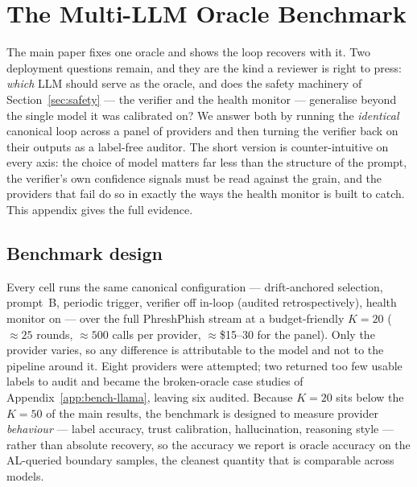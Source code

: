 
\appendix

\section{The Multi-LLM Oracle Benchmark}
\label{app:bench}

The main paper fixes one oracle and shows the loop recovers with it. Two
deployment questions remain, and they are the kind a reviewer is right to press:
\emph{which} LLM should serve as the oracle, and does the safety machinery of
Section~\ref{sec:safety} --- the verifier and the health monitor --- generalise
beyond the single model it was calibrated on? We answer both by running the
\emph{identical} canonical loop across a panel of providers and then turning the
verifier back on their outputs as a label-free auditor. The short version is
counter-intuitive on every axis: the choice of model matters far less than the
structure of the prompt, the verifier's own confidence signals must be read
against the grain, and the providers that fail do so in exactly the ways the
health monitor is built to catch. This appendix gives the full evidence.

\subsection{Benchmark design}
\label{app:bench-design}

Every cell runs the same canonical configuration --- drift-anchored selection,
prompt~B, periodic trigger, verifier off in-loop (audited retrospectively),
health monitor on --- over the full PhreshPhish stream at a budget-friendly
$K{=}20$ ($\approx 25$ rounds, $\approx 500$ calls per provider,
$\approx$\$15--30 for the panel). Only the provider varies, so any difference is
attributable to the model and not to the pipeline around it. Eight providers were
attempted; two returned too few usable labels to audit and became the
broken-oracle case studies of Appendix~\ref{app:bench-llama}, leaving six audited.
Because $K{=}20$ sits below the $K{=}50$ of the main results, the benchmark is
designed to measure provider \emph{behaviour} --- label accuracy, trust
calibration, hallucination, reasoning style --- rather than absolute recovery, so
the accuracy we report is oracle accuracy on the AL-queried boundary samples, the
cleanest quantity that is comparable across models.

